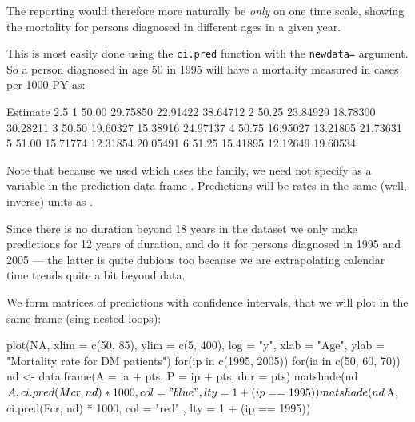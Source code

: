 \begin{enumerate}[resume]
  The reporting would therefore more naturally be \emph{only} on one
  time scale, showing the mortality for persons diagnosed in
  different ages in a given year.

  This is most easily done using the \texttt{ci.pred} function with
  the \texttt{newdata=} argument. So a person diagnosed in age 50 in
  1995 will have a mortality measured in cases per 1000 PY as:
\begin{Schunk}
\begin{Soutput}
        Estimate     2.5%    97.5%
1 50.00 29.75850 22.91422 38.64712
2 50.25 23.84929 18.78300 30.28211
3 50.50 19.60327 15.38916 24.97137
4 50.75 16.95027 13.21805 21.73631
5 51.00 15.71774 12.31854 20.05491
6 51.25 15.41895 12.12649 19.60534
\end{Soutput}
\end{Schunk}
  Note that because we used  which uses
  the family, we need not specify  as a
  variable in the prediction data frame . Predictions will
  be rates in the same (well, inverse) units as .

Since there is no duration beyond 18 years in the dataset we only make
predictions for 12 years of duration, and do it for persons diagnosed
in 1995 and 2005 --- the latter is quite dubious too because we are
extrapolating calendar time trends quite a bit beyond data.

We form matrices of predictions with confidence intervals, that we
will plot in the same frame (sing nested loops):
\begin{Schunk}
\begin{Sinput}
 plot(NA, xlim = c(50, 85), ylim = c(5, 400), log = "y",
          xlab = "Age", ylab = "Mortality rate for DM patients")
 for(ip in c(1995, 2005))
 for(ia in c(50, 60, 70))
    {
 nd <- data.frame(A = ia + pts,
                  P = ip + pts,
                dur =      pts)
 matshade(nd$A, ci.pred(Mcr, nd) * 1000, col = "blue", lty = 1 + (ip == 1995))
 matshade(nd$A, ci.pred(Fcr, nd) * 1000, col = "red" , lty = 1 + (ip == 1995))
    }
\end{Sinput}
\end{Schunk}


\end{enumerate}

